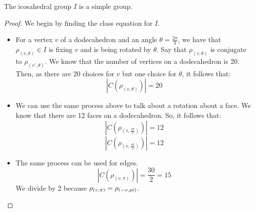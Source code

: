 \documentclass[letterpaper]{article}
\begin{document}
\begin{theorem}{}{}
    The icosahedral group $I$ is a simple group. 
\end{theorem}

\begin{mdframed}
    \begin{proof}
        We begin by finding the class equation for $I$. 
        \begin{itemize}
            \item For a vertex $v$ of a dodecahedron and an angle $\theta = \frac{2\pi}{3}$, we have that $\rho_{(v, \theta)} \in I$ is fixing $v$ and is being rotated by $\theta$. Say that $\rho_{(v, \theta)}$ is conjugate to $\rho_{(v', \theta)}$. We know that the number of vertices on a dodecahedron is 20. Then, as there are 20 choices for $v$ but one choice for $\theta$, it follows that:
            \[|C(\rho_{(v, \theta)})| = 20\]
            \item We can use the same process above to talk about a rotation about a face. We know that there are 12 faces on a dodecahedron. So, it follows that: 
            \[|C(\rho_{(v, \frac{2\pi}{5})})| = 12\]
            \[|C(\rho_{(v, \frac{4\pi}{5})})| = 12\]
            \item The same process can be used for edges. 
            \[|C(\rho_{(v, \pi)})| = \frac{30}{2} = 15\]
            We divide by 2 because $\rho_{(v, \pi)} = \rho_{(-v, \-pi)}$.
        \end{itemize}


\end{proof}
\end{mdframed}
\end{document}
